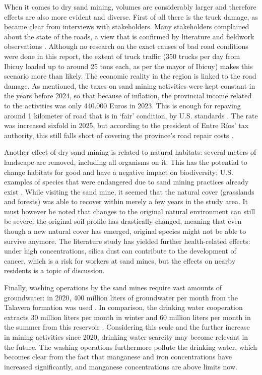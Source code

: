 When it comes to dry sand mining, volumes are considerably larger and therefore effects are also more evident and diverse. First of all there is the truck damage, as became clear from interviews with stakeholders. Many stakeholders complained about the state of the roads, a view that is confirmed by literature and fieldwork observations \autocite{fogliaSedArena2023} \autocite{novasImpactoAmbientalOculto2022}. Although no research on the exact causes of bad road conditions were done in this report, the extent of truck traffic (350 trucks per day from Ibicuy loaded up to around 25 tons each, as per the mayor of Ibicuy) makes this scenario more than likely. The economic reality in the region is linked to the road damage. As mentioned, the taxes on sand mining activities were kept constant in the years before 2024, so that because of inflation, the provincial income related to the activities was only 440.000 Euros in 2023. This is enough for repaving around 1 kilometer of road that is in `fair' condition, by U.S. standards \autocite{crumbCostRoadMaintenance2024}. The rate was increased sixfold in 2025, but according to the president of Entre Ríos’ tax authority, this still falls short of covering the province’s road repair costs \autocite{bellatoEntreRiosFrigerio2025}.

Another effect of dry sand mining is related to natural habitats: several meters of landscape are removed, including all organisms on it. This has the potential to change habitats for good and have a negative impact on biodiversity; U.S. examples of species that were endangered due to sand mining practices already exist \autocite{centerforbiologicaldiversityLegalInterventionLaunched2025}. While visiting the sand mine, it seemed that the natural cover (grasslands and forests) was able to recover within merely a few years in the study area. It must however be noted that changes to the original natural environment can still be severe: the original soil profile has drastically changed, meaning that even though a new natural cover has emerged, original species might not be able to survive anymore. The literature study has yielded further health-related effects: under high concentrations, silica dust can contribute to the development of cancer, which is a risk for workers at sand mines, but the effects on nearby residents is a topic of discussion.

Finally, washing operations by the sand mines require vast amounts of groundwater: in 2020, 400 million liters of groundwater per month from the Talavera formation was used \autocite{cauceArenasParaFracking2022}. In comparison, the drinking water cooperation extracts 30 million liters per month in winter and 60 million liters per month in the summer from this reservoir \autocite{fogliaSedArena2023}. Considering this scale and the further increase in mining activities since 2020, drinking water scarcity may become relevant in the future. The washing operations furthermore pollute the drinking water, which becomes clear from the fact that manganese and iron concentrations have increased significantly, and manganese concentrations are above limits now.

